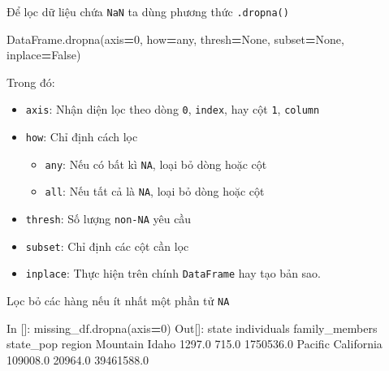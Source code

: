 \documentclass[
]{book}
\newenvironment{Shaded}{\begin{snugshade}}{\end{snugshade}}
\newcommand{\DecValTok}[1]{\textcolor[rgb]{0.00,0.00,0.81}{#1}}
\newcommand{\FloatTok}[1]{\textcolor[rgb]{0.00,0.00,0.81}{#1}}
\newcommand{\NormalTok}[1]{#1}
\newcommand{\OperatorTok}[1]{\textcolor[rgb]{0.81,0.36,0.00}{\textbf{#1}}}
\newcommand{\StringTok}[1]{\textcolor[rgb]{0.31,0.60,0.02}{#1}}
\newcommand{\VariableTok}[1]{\textcolor[rgb]{0.00,0.00,0.00}{#1}}
\providecommand{\tightlist}{%
  \setlength{\itemsep}{0pt}\setlength{\parskip}{0pt}}
\begin{document}
Để lọc dữ liệu chứa \texttt{NaN} ta dùng phương thức \texttt{.dropna()}

\begin{Shaded}
\begin{Highlighting}[]
\NormalTok{DataFrame.dropna(axis}\OperatorTok{=}\DecValTok{0}\NormalTok{, how}\OperatorTok{=}\StringTok{\textquotesingle{}any\textquotesingle{}}\NormalTok{, thresh}\OperatorTok{=}\VariableTok{None}\NormalTok{, subset}\OperatorTok{=}\VariableTok{None}\NormalTok{, inplace}\OperatorTok{=}\VariableTok{False}\NormalTok{)}
\end{Highlighting}
\end{Shaded}

Trong đó:

\begin{itemize}
\item
  \texttt{axis}: Nhận diện lọc theo dòng \texttt{0}, \texttt{index}, hay cột \texttt{1}, \texttt{column}
\item
  \texttt{how}: Chỉ định cách lọc

  \begin{itemize}
  \tightlist
  \item
    \texttt{any}: Nếu có bất kì \texttt{NA}, loại bỏ dòng hoặc cột
  \item
    \texttt{all}: Nếu tất cả là \texttt{NA}, loại bỏ dòng hoặc cột
  \end{itemize}
\item
  \texttt{thresh}: Số lượng \texttt{non-NA} yêu cầu
\item
  \texttt{subset}: Chỉ định các cột cần lọc
\item
  \texttt{inplace}: Thực hiện trên chính \texttt{DataFrame} hay tạo bản sao.
\end{itemize}

Lọc bỏ các hàng nếu ít nhất một phần tử \texttt{NA}

\begin{Shaded}
\begin{Highlighting}[]
\NormalTok{In []: missing\_df.dropna(axis}\OperatorTok{=}\DecValTok{0}\NormalTok{)}
\NormalTok{Out[]:}
\NormalTok{               state  individuals  family\_members   state\_pop}
\NormalTok{region                                                       }
\NormalTok{Mountain       Idaho       }\FloatTok{1297.0}           \FloatTok{715.0}   \FloatTok{1750536.0}
\NormalTok{Pacific   California     }\FloatTok{109008.0}         \FloatTok{20964.0}  \FloatTok{39461588.0}
\end{Highlighting}
\end{Shaded}
\end{document}
